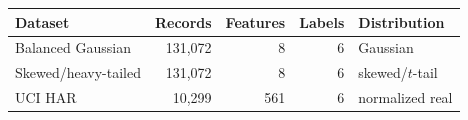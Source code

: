 \begin{tabular}{lrrrl}
\toprule
Dataset & Records & Features & Labels & Distribution \\
\midrule
Balanced Gaussian & 131,072 & 8 & 6 & Gaussian \\
Skewed/heavy-tailed & 131,072 & 8 & 6 & skewed/$t$-tail \\
UCI HAR & 10,299 & 561 & 6 & normalized real \\
\bottomrule
\end{tabular}
